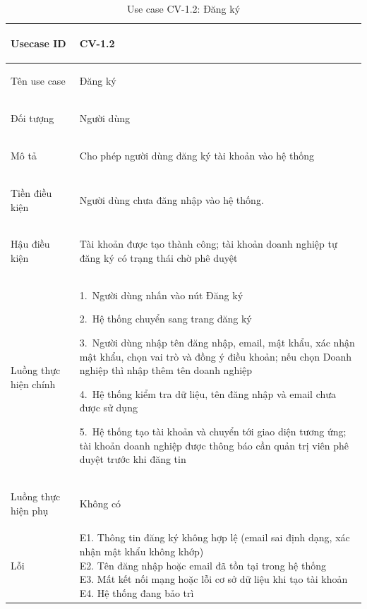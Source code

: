 \begin{table}[H]
    \centering
    \small
    \renewcommand{\arraystretch}{1.0}
    \begin{tabularx}{\textwidth}{|
        >{\bfseries\raggedright\arraybackslash}p{3.2cm}|Y|}
        \hline

        Usecase ID& CV-1.2 \\ \hline

        Tên use case & Đăng ký \\ \hline

        Đối tượng & Người dùng \\ \hline

        Mô tả & Cho phép người dùng đăng ký tài khoản vào hệ thống \\ \hline

        Tiền điều kiện &
        \parbox[t]{\hsize}{
            Người dùng chưa đăng nhập vào hệ thống.\par
        } \\
        \hline

        Hậu điều kiện & Tài khoản được tạo thành công; tài khoản doanh nghiệp tự đăng ký có trạng thái chờ phê duyệt \\ \hline

        Luồng thực hiện chính&
        \parbox[t]{\hsize}{
            1.\ Người dùng nhấn vào nút Đăng ký\par
            2.\ Hệ thống chuyển sang trang đăng ký\par
            3.\ Người dùng nhập tên đăng nhập, email, mật khẩu, xác nhận mật khẩu, chọn vai trò và đồng ý điều khoản; nếu chọn Doanh nghiệp thì nhập thêm tên doanh nghiệp\par
            4.\ Hệ thống kiểm tra dữ liệu, tên đăng nhập và email chưa được sử dụng\par
            5.\ Hệ thống tạo tài khoản và chuyển tới giao diện tương ứng; tài khoản doanh nghiệp được thông báo cần quản trị viên phê duyệt trước khi đăng tin}\\
        \hline

        Luồng thực hiện phụ& Không có \\
        \hline

        Lỗi &
        \parbox[t]{\hsize}{
            E1. Thông tin đăng ký không hợp lệ (email sai định dạng, xác nhận mật khẩu không khớp)\\
            E2. Tên đăng nhập hoặc email đã tồn tại trong hệ thống\\
            E3. Mất kết nối mạng hoặc lỗi cơ sở dữ liệu khi tạo tài khoản\\
            E4. Hệ thống đang bảo trì
        }\\
        \hline

    \end{tabularx}

    \caption{Use case CV-1.2: Đăng ký}
    \label{tab:usecase-cv12}
\end{table}

